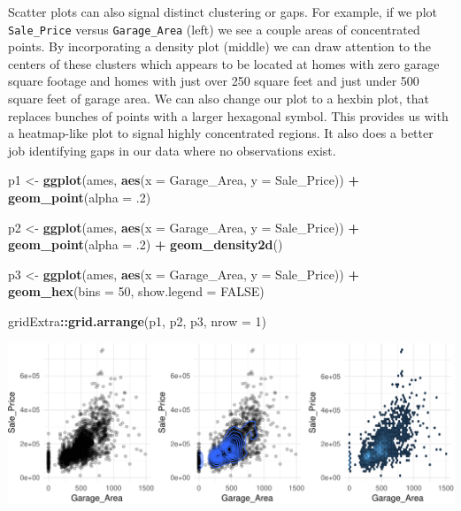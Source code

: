 \documentclass[]{article}
\newenvironment{Shaded}{\begin{snugshade}}{\end{snugshade}}
\newcommand{\KeywordTok}[1]{\textcolor[rgb]{0.13,0.29,0.53}{\textbf{#1}}}
\newcommand{\DataTypeTok}[1]{\textcolor[rgb]{0.13,0.29,0.53}{#1}}
\newcommand{\DecValTok}[1]{\textcolor[rgb]{0.00,0.00,0.81}{#1}}
\newcommand{\StringTok}[1]{\textcolor[rgb]{0.31,0.60,0.02}{#1}}
\newcommand{\OtherTok}[1]{\textcolor[rgb]{0.56,0.35,0.01}{#1}}
\newcommand{\OperatorTok}[1]{\textcolor[rgb]{0.81,0.36,0.00}{\textbf{#1}}}
\newcommand{\NormalTok}[1]{#1}
\begin{document}
Scatter plots can also signal distinct clustering or gaps. For example,
if we plot \texttt{Sale\_Price} versus \texttt{Garage\_Area} (left) we
see a couple areas of concentrated points. By incorporating a density
plot (middle) we can draw attention to the centers of these clusters
which appears to be located at homes with zero garage square footage and
homes with just over 250 square feet and just under 500 square feet of
garage area. We can also change our plot to a hexbin plot, that replaces
bunches of points with a larger hexagonal symbol. This provides us with
a heatmap-like plot to signal highly concentrated regions. It also does
a better job identifying gaps in our data where no observations exist.

\begin{Shaded}
\begin{Highlighting}[]
\NormalTok{p1 <-}\StringTok{ }\KeywordTok{ggplot}\NormalTok{(ames, }\KeywordTok{aes}\NormalTok{(}\DataTypeTok{x =}\NormalTok{ Garage_Area, }\DataTypeTok{y =}\NormalTok{ Sale_Price)) }\OperatorTok{+}\StringTok{ }
\StringTok{  }\KeywordTok{geom_point}\NormalTok{(}\DataTypeTok{alpha =}\NormalTok{ .}\DecValTok{2}\NormalTok{)}

\NormalTok{p2 <-}\StringTok{ }\KeywordTok{ggplot}\NormalTok{(ames, }\KeywordTok{aes}\NormalTok{(}\DataTypeTok{x =}\NormalTok{ Garage_Area, }\DataTypeTok{y =}\NormalTok{ Sale_Price)) }\OperatorTok{+}\StringTok{ }
\StringTok{  }\KeywordTok{geom_point}\NormalTok{(}\DataTypeTok{alpha =}\NormalTok{ .}\DecValTok{2}\NormalTok{) }\OperatorTok{+}\StringTok{ }
\StringTok{  }\KeywordTok{geom_density2d}\NormalTok{()}

\NormalTok{p3 <-}\StringTok{ }\KeywordTok{ggplot}\NormalTok{(ames, }\KeywordTok{aes}\NormalTok{(}\DataTypeTok{x =}\NormalTok{ Garage_Area, }\DataTypeTok{y =}\NormalTok{ Sale_Price)) }\OperatorTok{+}\StringTok{ }
\StringTok{  }\KeywordTok{geom_hex}\NormalTok{(}\DataTypeTok{bins =} \DecValTok{50}\NormalTok{, }\DataTypeTok{show.legend =} \OtherTok{FALSE}\NormalTok{)}

\NormalTok{gridExtra}\OperatorTok{::}\KeywordTok{grid.arrange}\NormalTok{(p1, p2, p3, }\DataTypeTok{nrow =} \DecValTok{1}\NormalTok{)}
\end{Highlighting}
\end{Shaded}

\begin{center}\includegraphics{Chapter_3_-_Visualization_files/figure-latex/density_plot-1} \end{center}
\end{document}
